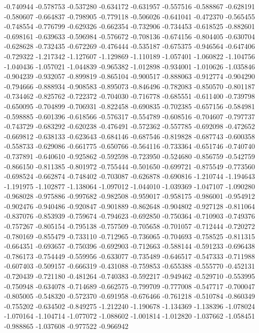 -0.740944
-0.578753
-0.537280
-0.634172
-0.631957
-0.557516
-0.588867
-0.628191
-0.580607
-0.664837
-0.798905
-0.779118
-0.506026
-0.641041
-0.472370
-0.565455
-0.748554
-0.776799
-0.629326
-0.662354
-0.732906
-0.734453
-0.618525
-0.882601
-0.698161
-0.639633
-0.596984
-0.576672
-0.708136
-0.674156
-0.804405
-0.630704
-0.628628
-0.732435
-0.672269
-0.476444
-0.535187
-0.675375
-0.946564
-0.647406
-0.729322
-1.217342
-1.127607
-1.129869
-1.110189
-1.057401
-1.060822
-1.104756
-1.040436
-1.057021
-1.044839
-0.965382
-1.012898
-0.934001
-1.010626
-1.035846
-0.904239
-0.932057
-0.899819
-0.865104
-0.900517
-0.888063
-0.912774
-0.904290
-0.794666
-0.888934
-0.908583
-0.895073
-0.846496
-0.782083
-0.850570
-0.801187
-0.734462
-0.825762
-0.722372
-0.704030
-0.716778
-0.685551
-0.611400
-0.739798
-0.650095
-0.704899
-0.706931
-0.822458
-0.690835
-0.702385
-0.657156
-0.584981
-0.598885
-0.601396
-0.618566
-0.576317
-0.554789
-0.608516
-0.704607
-0.797737
-0.743729
-0.683292
-0.620238
-0.476491
-0.572362
-0.557785
-0.692098
-0.472652
-0.669812
-0.638133
-0.623643
-0.684146
-0.687546
-0.819828
-0.687743
-0.600358
-0.558733
-0.629086
-0.661775
-0.650766
-0.564116
-0.733364
-0.651746
-0.740740
-0.737891
-0.640610
-0.925862
-0.592598
-0.723950
-0.524680
-0.856759
-0.542759
-0.866150
-0.811385
-0.801972
-0.755444
-0.501650
-0.699721
-0.875549
-0.773560
-0.698524
-0.662874
-0.748402
-0.703087
-0.626878
-0.690816
-1.210744
-1.194643
-1.191975
-1.102877
-1.138064
-1.097012
-1.044010
-1.039369
-1.047107
-1.090280
-0.968028
-0.975886
-0.997682
-0.982508
-0.959017
-0.958175
-0.986001
-0.954912
-0.902476
-0.940486
-0.920847
-0.901889
-0.862648
-0.904802
-0.927128
-0.811064
-0.837076
-0.853939
-0.759674
-0.794623
-0.692850
-0.750364
-0.710903
-0.749376
-0.757267
-0.805154
-0.795138
-0.757509
-0.705658
-0.701057
-0.712444
-0.720272
-0.780169
-0.855479
-0.733110
-0.712965
-0.736065
-0.704693
-0.758525
-0.811315
-0.664351
-0.693657
-0.750396
-0.692903
-0.712663
-0.588144
-0.591233
-0.696438
-0.786173
-0.754449
-0.559956
-0.633077
-0.735489
-0.646517
-0.547333
-0.711988
-0.607403
-0.509157
-0.666319
-0.431088
-0.759853
-0.655388
-0.555770
-0.452131
-0.720439
-0.721180
-0.481264
-0.740383
-0.592217
-0.949462
-0.529710
-0.553995
-0.750948
-0.634078
-0.714689
-0.662575
-0.799709
-0.777008
-0.547717
-0.700047
-0.805005
-0.548320
-0.572370
-0.691958
-0.676466
-0.761218
-0.510784
-0.860349
-0.755202
-0.634502
-0.849275
-1.212240
-1.190678
-1.134369
-1.138396
-1.078024
-1.070164
-1.104714
-1.077072
-1.088602
-1.001814
-1.012820
-1.037662
-1.058451
-0.988865
-1.037608
-0.977522
-0.966942
